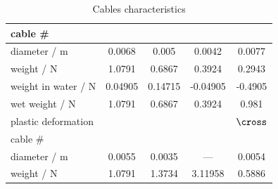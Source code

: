 \begin{table}
	\centering
	\robustify\bfseries
	\caption{Cables characteristics}
	\begin{tabular}{@{}l|SSSS@{}}
		\toprule
		cable \#                    &  &  &  &  \\ \midrule
		diameter / \unit{\m}        & 0.0068                                        & 0.005                                            & 0.0042                                          & 0.0077                                         \\
		weight / \unit{\N}          & 1.0791                                        & 0.6867                                           & 0.3924                                          & 0.2943                                         \\
		weight in water / \unit{\N} & 0.04905                                       & 0.14715                                          & -0.04905                                        & -0.4905                                        \\
		wet weight / \unit{\N}      & 1.0791                                        & 0.6867                                           & 0.3924                                          & 0.981                                          \\
		plastic deformation         & {\checkmark}                                  & {\checkmark}                                     & {\checkmark}                                    & {$\cross$}                                     \\ \midrule[1pt]
		cable \#                    &     &    &      &   \\ \midrule
		diameter / \unit{\m}        & 0.0055                                        & 0.0035                                           & {---}                                           & 0.0054                                         \\
		weight / \unit{\N}          & 1.0791                                        & 1.3734                                           & 3.11958                                         & 0.5886                                         \\

\end{tabular}
\end{table}
